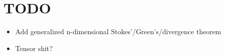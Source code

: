 \documentclass[a4paper,11pt]{report}
\begin{document}
\section{TODO}
\begin{itemize} \itemsep -2pt
    \item Add generalized n-dimensional Stokes'/Green's/divergence theorem
    \item Tensor shit?
\end{itemize}

\end{document}
